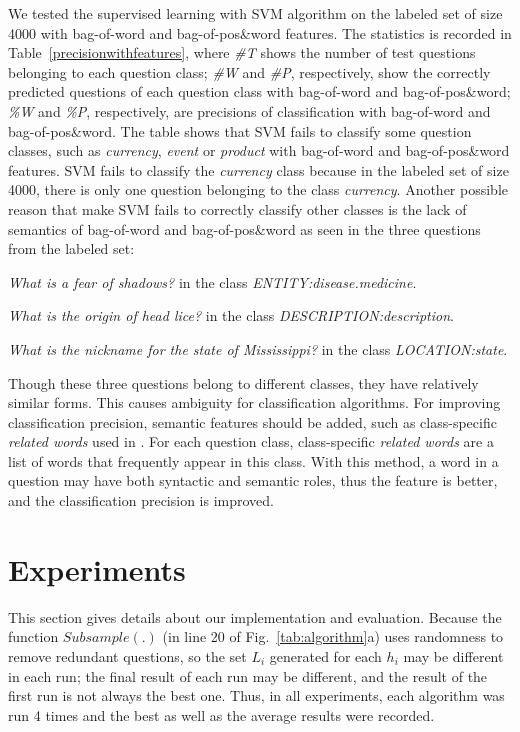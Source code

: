 \documentclass[english]{jnlp_1.4}
\begin{document}
We tested the supervised learning with SVM algorithm on the
labeled set of size 4000 with bag-of-word and bag-of-pos\&word
features. The statistics is recorded in
Table~\ref{precisionwithfeatures}, where \textit{\#T} shows the
number of test questions belonging to each question class;
\textit{\#W} and \textit{\#P}, respectively, show the correctly
predicted questions of each question class with bag-of-word and
bag-of-pos\&word; \textit{\%W} and \textit{\%P}, respectively, are
precisions of classification with bag-of-word and
bag-of-pos\&word. The table shows that SVM fails to classify some
question classes, such as \textit{currency}, \textit{event} or
\textit{product} with bag-of-word and bag-of-pos\&word features.
SVM fails to classify the \textit{currency} class because in the
labeled set of size 4000, there is only one question belonging to
the class \textit{currency}. Another possible reason that make SVM
fails to correctly classify other classes is the lack of semantics
of bag-of-word and bag-of-pos\&word as seen in the three questions
from the labeled set:
\begin{list}{+}{}
\item \textit{What is a fear of shadows?} in the class \textit{ENTITY:disease.medicine}.
\item \textit{What is the origin of head lice?} in the class \textit{DESCRIPTION:description}.
\item \textit{What is the nickname for the state of Mississippi?} in the class \textit{LOCATION:state}.
\end{list}
Though these three questions belong to different classes, they have relatively similar forms. This causes ambiguity for classification algorithms. For improving classification precision, semantic features should be added, such as class-specific \textit{related words} used in \cite{Li02}. For each question class, class-specific \textit{related words} are a list of words that frequently appear in this class. With this method, a word in a question may have both syntactic and semantic roles, thus the feature is better, and the classification precision is improved.




\section{Experiments}

This section gives details about our implementation and
evaluation. Because the function $Subsample(.)$ (in line 20 of
Fig.~\ref{tab:algorithm}a) uses randomness to remove redundant
questions, so the set $L_{i}$ generated for each $h_{i}$ may be
different in each run; the final result of each run may be
different, and the result of the first run is not always the best
one. Thus, in all experiments, each algorithm was run 4 times and
the best as well as the average results were recorded.
\end{document}
